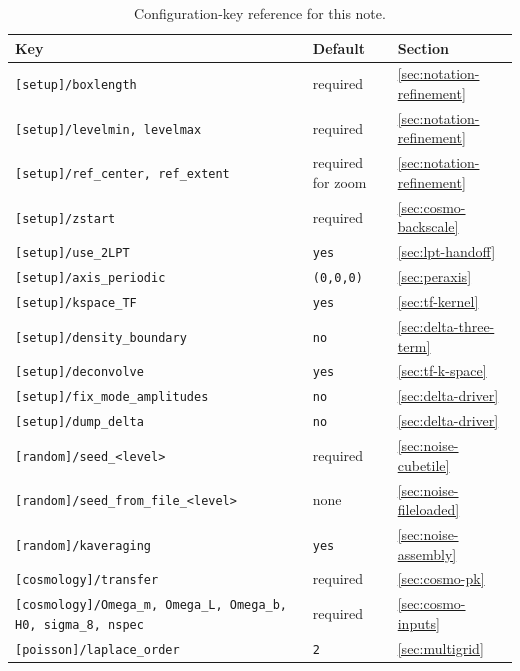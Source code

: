 \documentclass[12pt]{article}
\newcommand{\code}[1]{\texttt{#1}}
\begin{document}
\begin{table}[h]
\centering
\small
\begin{tabular}{lll}
\toprule
Key & Default & Section \\
\midrule
\code{[setup]/boxlength}              & required & \ref{sec:notation-refinement} \\
\code{[setup]/levelmin, levelmax}     & required & \ref{sec:notation-refinement} \\
\code{[setup]/ref\_center, ref\_extent} & required for zoom & \ref{sec:notation-refinement} \\
\code{[setup]/zstart}                 & required & \ref{sec:cosmo-backscale} \\
\code{[setup]/use\_2LPT}              & \code{yes} & \ref{sec:lpt-handoff} \\
\code{[setup]/axis\_periodic}         & \code{(0,0,0)} & \ref{sec:peraxis} \\
\code{[setup]/kspace\_TF}             & \code{yes} & \ref{sec:tf-kernel} \\
\code{[setup]/density\_boundary}      & \code{no}  & \ref{sec:delta-three-term} \\
\code{[setup]/deconvolve}             & \code{yes} & \ref{sec:tf-k-space} \\
\code{[setup]/fix\_mode\_amplitudes}  & \code{no}  & \ref{sec:delta-driver} \\
\code{[setup]/dump\_delta}            & \code{no}  & \ref{sec:delta-driver} \\
\code{[random]/seed\_<level>}         & required & \ref{sec:noise-cubetile} \\
\code{[random]/seed\_from\_file\_<level>} & none & \ref{sec:noise-fileloaded} \\
\code{[random]/kaveraging}            & \code{yes} & \ref{sec:noise-assembly} \\
\code{[cosmology]/transfer}           & required & \ref{sec:cosmo-pk} \\
\code{[cosmology]/Omega\_m, Omega\_L, Omega\_b, H0, sigma\_8, nspec}
                                       & required & \ref{sec:cosmo-inputs} \\
\code{[poisson]/laplace\_order}       & \code{2}   & \ref{sec:multigrid} \\
\bottomrule
\end{tabular}
\caption{Configuration-key reference for this note.}
\label{tab:config-keys}
\end{table}

\appendix
\end{document}
